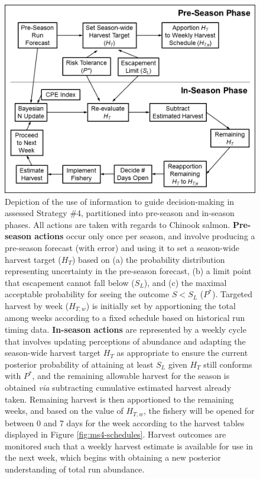 \documentclass[12pt,]{book}
\theoremstyle{definition}
\theoremstyle{definition}
\theoremstyle{definition}
\theoremstyle{remark}
\begin{document}
\begin{singlespace}
\begin{figure}
  \centering
  \includegraphics{img/Ch3/ms4-flow-diag.jpg}
  \caption{Depiction of the use of information to guide decision-making in assessed Strategy \#4, partitioned into pre-season and in-season phases. All actions are taken with regards to Chinook salmon. \textbf{Pre-season actions} occur only once per season, and involve producing a pre-season forecast (with error) and using it to set a season-wide harvest target ($H_T$) based on (a) the probability distribution representing uncertainty in the pre-season forecast, (b) a limit point that escapement cannot fall below ($S_L$), and (c) the maximal acceptable probability for seeing the outcome $S < S_L$ ($P^*$). Targeted harvest by week ($H_{T,w}$) is initially set by apportioning the total among weeks according to a fixed schedule based on historical run timing data. \textbf{In-season actions} are represented by a weekly cycle that involves updating perceptions of abundance and adapting the season-wide harvest target $H_T$ as appropriate to ensure the current posterior probability of attaining at least $S_L$ given $H_T$ still conforms with $P^*$, and the remaining allowable harvest for the season is obtained \textit{via} subtracting cumulative estimated harvest already taken. Remaining harvest is then apportioned to the remaining weeks, and based on the value of $H_{T,w}$, the fishery will be opened for between 0 and 7 days for the week according to the harvest tables displayed in Figure \ref{fig:ms4-schedules}. Harvest outcomes are monitored such that a weekly harvest estimate is available for use in the next week, which begins with obtaining a new posterior understanding of total run abundance.}
  \label{fig:ms4-flow-diag}
\end{figure}


\end{singlespace}
\end{document}
